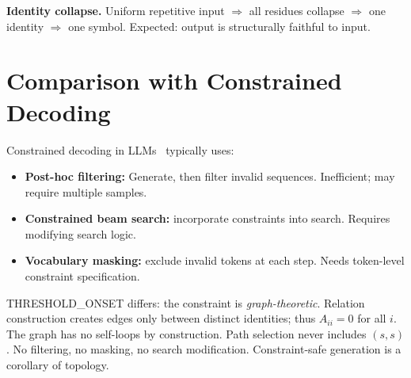 \textbf{Identity collapse.}
Uniform repetitive input $\Rightarrow$ all residues collapse $\Rightarrow$ one identity $\Rightarrow$ one symbol. Expected: output is structurally faithful to input.

\section{Comparison with Constrained Decoding}
\label{app:constrained}

Constrained decoding in LLMs~\cite{raffel2019t5} typically uses:
\begin{itemize}
\item \textbf{Post-hoc filtering:} Generate, then filter invalid sequences. Inefficient; may require multiple samples.
\item \textbf{Constrained beam search:} incorporate constraints into search. Requires modifying search logic.
\item \textbf{Vocabulary masking:} exclude invalid tokens at each step. Needs token-level constraint specification.
\end{itemize}

THRESHOLD\_ONSET differs: the constraint is \emph{graph-theoretic}. Relation construction creates edges only between distinct identities; thus $A_{ii} = 0$ for all $i$. The graph has no self-loops by construction. Path selection never includes $(s, s)$. No filtering, no masking, no search modification. Constraint-safe generation is a corollary of topology.
